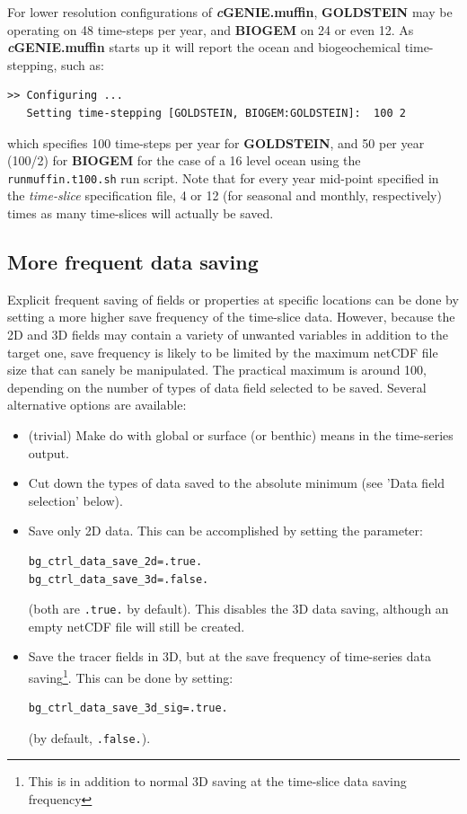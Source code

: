 \documentclass[11pt,fleqn]{book} %
\begin{document}
For lower resolution configurations of \textbf{\textit{c}GENIE.muffin}, \textbf{GOLDSTEIN} may be operating on 48 time-steps per year, and \textbf{BIOGEM} on 24 or even 12. As \textbf{\textit{c}GENIE.muffin} starts up it will report the ocean and biogeochemical time-stepping, such as:
\small\begin{verbatim}
>> Configuring ...
   Setting time-stepping [GOLDSTEIN, BIOGEM:GOLDSTEIN]:  100 2
\end{verbatim}\normalsize
which specifies 100 time-steps per year for \textbf{GOLDSTEIN}, and 50 per year (100/2) for \textbf{BIOGEM} for the case of a 16 level ocean using the \texttt{runmuffin.t100.sh} run script.
Note that for every year mid-point specified in the\textit{ time-slice} specification file, 4 or 12 (for seasonal and monthly, respectively) times as many time-slices will actually be saved.

%
\subsection{More frequent data saving}

Explicit frequent saving of fields or properties at specific locations can be done by setting a more higher save frequency of the time-slice data. However, because the 2D and 3D fields may contain a variety of unwanted variables in addition to the target one, save frequency is likely to be limited by the maximum netCDF file size that can sanely be manipulated. The practical maximum is around 100, depending on the number of types of data field selected to be saved. Several alternative options are available:

\begin{itemize}
\item (trivial) Make do with global or surface (or benthic) means in the time-series output.
\item Cut down the types of data saved to the absolute minimum (see 'Data field selection' below).
\item Save only 2D data. This can be accomplished by setting the parameter:
\vspace{-1mm}\begin{verbatim}
bg_ctrl_data_save_2d=.true.
bg_ctrl_data_save_3d=.false.
\end{verbatim}\vspace{-1mm}
(both are \texttt{.true.} by default). This disables the 3D data saving, although an empty netCDF file will still be created.
\item Save the tracer fields in 3D, but at the save frequency of time-series data saving\footnote{This is in addition to normal 3D saving at the time-slice data saving frequency}. This can be done by setting:
\vspace{-1mm}\begin{verbatim}
bg_ctrl_data_save_3d_sig=.true.
\end{verbatim}\vspace{-1mm}
(by default, \texttt{.false.}).
\end{itemize}
\end{document}

